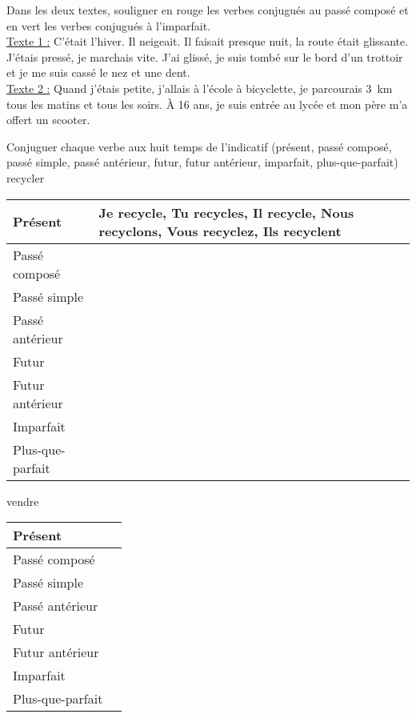 \documentclass["../Cours.tex"]{subfiles}
\begin{document}
\begin{questions}

    \exercice Dans les deux textes, souligner en rouge les verbes conjugués au passé composé et en vert les verbes conjugués à l’imparfait.\\

    \underline{Texte 1 :} C’était l’hiver. Il neigeait. Il faisait presque nuit, la route était glissante. J’étais pressé, je marchais vite. J’ai glissé, je suis tombé sur le bord d’un trottoir et je me suis cassé le nez et une dent.\\

    
    \underline{Texte 2 :} Quand j’étais petite, j’allais à l’école à bicyclette, je parcourais \qty{3}{\kilo\metre} tous les matins et tous les soirs. À 16 ans, je suis entrée au lycée et mon père m’a offert un scooter.


    \exercice Conjuguer chaque verbe aux huit temps de l'indicatif (présent, passé composé, passé simple, passé antérieur, futur, futur antérieur, imparfait, plus-que-parfait)
    \question recycler

    \begin{center}
        \begin{tabularx}{\linewidth}{|l|X|}\hline
            Présent & Je recycle, Tu recycles, Il recycle, Nous recyclons, Vous recyclez, Ils recyclent \\\hline
            Passé composé & \\\hline
            Passé simple & \\\hline
            Passé antérieur & \\\hline
            Futur & \\\hline
            Futur antérieur & \\\hline
            Imparfait & \\\hline
            Plus-que-parfait & \\\hline
        \end{tabularx}
    \end{center}
    
    \question vendre
    \begin{center}
        \begin{tabularx}{\linewidth}{|l|X|}\hline
            Présent &  \\\hline
            Passé composé & \\\hline
            Passé simple & \\\hline
            Passé antérieur & \\\hline
            Futur & \\\hline
            Futur antérieur & \\\hline
            Imparfait & \\\hline
            Plus-que-parfait & \\\hline
        \end{tabularx}
    \end{center}
    

\end{questions}
\end{document}
